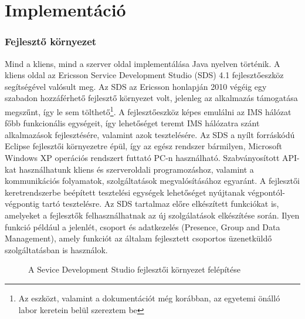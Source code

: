 \section{Implementáció}

\subsubsection{Fejlesztő környezet}

Mind a kliens, mind a szerver oldal implementálása Java nyelven történik. A kliens oldal az Ericsson Service Development Studio (SDS) 4.1 fejlesztőeszköz segítségével valósult meg. Az SDS az Ericsson honlapján 2010 végéig egy szabadon hozzáférhető fejlesztő környezet volt, jelenleg az alkalmazás támogatása megszűnt, így le sem tölthető\footnote{Az eszközt, valamint a dokumentációt még korábban, az egyetemi önálló labor keretein belül szereztem be}. A fejlesztőeszköz képes emulálni az IMS hálózat főbb funkcionális egységeit, így lehetőséget teremt IMS hálózatra szánt alkalmazások fejlesztésére, valamint azok tesztelésére. Az SDS a nyílt forráskódú Eclipse fejlesztői környezetre épül, így az egész rendszer bármilyen, Microsoft Windows XP operációs rendszert futtató PC-n használható. Szabványosított API-kat használhatunk kliens és szerveroldali programozáshoz, valamint a kommunikációs folyamatok, szolgáltatások megvalósításához egyaránt. A fejlesztői keretrendszerbe beépített tesztelési egységek lehetőséget nyújtanak végpontól-végpontig tartó tesztelésre. Az SDS tartalmaz előre elkészített funkciókat is, amelyeket a fejlesztők felhasználhatnak az új szolgálatások elkészítése során. Ilyen funkció például a jelenlét, csoport és adatkezelés (Presence, Group and Data Management), amely funkciót az általam fejlesztett csoportos üzenetküldő szolgáltatásban is használok.

\begin{figure}[htbp]
\center
{}
\caption{A Sevice Development Studio fejlesztői környezet felépítése}
\label{fig:model}
\end{figure}

